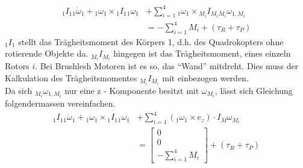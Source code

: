 \begin{align}
    {_{1} I_{1}} {_{1} \dot{\omega}_{1}} + {_{1} {\omega}_{1}} \times {_{1} I_{1}} {_{1} {\omega}_{1}} &+ \sum_{i=1}^{4}{{_{1} {\omega}_{1}} \times {_{M_i} I_{M_i}} {_{M_i} {\omega}_{1, M_i}}} \\
    &= -\sum_{i = 1}^{4}{M_i} + (\tau_{R} + \tau_{P})
\end{align}
${_{1} I_{1}}$ stellt das Trägheitsmoment des Körpers 1, d.h. des Quadrokopters ohne rotierende Objekte da. ${_{M_i} I_{M_i}}$ hingegen ist das Trägheitsmoment, eines einzeln Rotors $i$. Bei Brushlesh Motoren ist es so, das ``Wand'' mitdreht. Dies muss der Kalkulation des Trägheitsmomentes ${_{M_i} I_{M_i}}$ mit einbezogen werden.\\
Da sich ${_{M_i} {\omega}_{1, M_i}}$ nur eine z - Komponente besitzt mit $\omega_{M_i}$, lässt sich Gleichung folgendermassen vereinfachen.
\begin{align}
    {_{1} I_{1}} {_{1} \dot{\omega}_{1}} + {_{1} {\omega}_{1}} \times {_{1} I_{1}} {_{1} {\omega}_{1}} &+ \sum_{i=1}^{4}{({_{1}{\omega}_{1}} \times e_z) \cdot I_{M} \omega_{M_i} } \\
    &= \begin{bmatrix} 0 \\ 0 \\ -\sum_{i = 1}^{4}{M_i} \end{bmatrix} + (\tau_{R} + \tau_{P})
\end{align}

